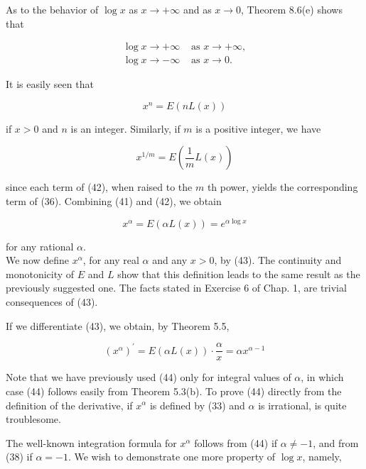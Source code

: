 \documentclass[10pt]{article}
\begin{document}
As to the behavior of $\log x$ as $x \rightarrow+\infty$ and as $x \rightarrow 0$, Theorem 8.6(e) shows that

$$
\begin{array}{ll}
\log x \rightarrow+\infty & \text { as } x \rightarrow+\infty, \\
\log x \rightarrow-\infty & \text { as } x \rightarrow 0 .
\end{array}
$$

It is easily seen that


\begin{equation*}
x^{n}=E(n L(x)) \tag{41}
\end{equation*}


if $x>0$ and $n$ is an integer. Similarly, if $m$ is a positive integer, we have


\begin{equation*}
x^{1 / m}=E\left(\frac{1}{m} L(x)\right) \tag{42}
\end{equation*}


since each term of (42), when raised to the $m$ th power, yields the corresponding term of (36). Combining (41) and (42), we obtain


\begin{equation*}
x^{\alpha}=E(\alpha L(x))=e^{\alpha \log x} \tag{43}
\end{equation*}


for any rational $\alpha$.\\
We now define $x^{\alpha}$, for any real $\alpha$ and any $x>0$, by (43). The continuity and monotonicity of $E$ and $L$ show that this definition leads to the same result as the previously suggested one. The facts stated in Exercise 6 of Chap. 1, are trivial consequences of (43).

If we differentiate (43), we obtain, by Theorem 5.5,


\begin{equation*}
\left(x^{\alpha}\right)^{\prime}=E(\alpha L(x)) \cdot \frac{\alpha}{x}=\alpha x^{\alpha-1} \tag{44}
\end{equation*}


Note that we have previously used (44) only for integral values of $\alpha$, in which case (44) follows easily from Theorem 5.3(b). To prove (44) directly from the definition of the derivative, if $x^{\alpha}$ is defined by (33) and $\alpha$ is irrational, is quite troublesome.

The well-known integration formula for $x^{\alpha}$ follows from (44) if $\alpha \neq-1$, and from (38) if $\alpha=-1$. We wish to demonstrate one more property of $\log x$, namely,
\end{document}
